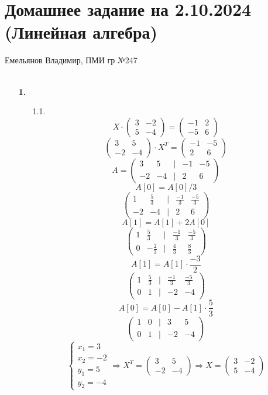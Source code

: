 \documentclass[a4paper]{article}
\newcommand{\mat}[1]{\begin{pmatrix} #1 \end{pmatrix}}
\renewcommand{\f}[2]{\frac{#1}{#2}}
\newcommand{\case}[1]{\begin{cases} #1 \end{cases}}
\renewcommand{\r}{\Rightarrow}
\begin{document}
\section*{Домашнее задание на 2.10.2024 (Линейная алгебра)}
{\large Емельянов Владимир, ПМИ гр №247}\\\\
\begin{enumerate}
    \item[\textbf{1.}]
    \begin{enumerate}
        \item[1.1.]
        $$X\cdot \mat{3 & -2 \\ 5 & -4} = \mat{-1 & 2 \\ -5 & 6}$$
        $$\mat{3 & 5 \\ -2 & -4} \cdot X^T = \mat{-1 & -5 \\ 2 & 6}$$
        $$A = \mat{3 & 5 & | & -1 & -5\\ -2 & -4 & | & 2 & 6}$$
        $$A[0] = A[0]/3$$
        $$\mat{1 & \f{5}{3} & | & \f{-1}{3} & \f{-5}{3}\\ -2 & -4 & | & 2 & 6}$$
        $$A[1] = A[1]+2A[0]$$
        $$\mat{1 & \f{5}{3} & | & \f{-1}{3} & \f{-5}{3}\\ 0 & -\f{2}{3} & | & \f{4}{3} & \f{8}{3}}$$
        $$A[1] = A[1]\cdot \f{-3}{2}$$
        $$\mat{1 & \f{5}{3} & | & \f{-1}{3} & \f{-5}{3}\\ 0 & 1 & | & -2 & -4}$$
        $$A[0] = A[0]-A[1]\cdot \f{5}{3}$$
        $$\mat{1 & 0 & | & 3 & 5\\ 0 & 1 & | & -2 & -4}$$
        $$\case{
            x_1 = 3\\
            x_2 = -2\\
            y_1 = 5 \\
            y_2 = -4 
        }\r X^T = \mat{3 & 5 \\ -2 & -4} \r X = \mat{3 & -2 \\ 5 & -4}$$ 


\end{enumerate}
\end{enumerate}
\end{document}
